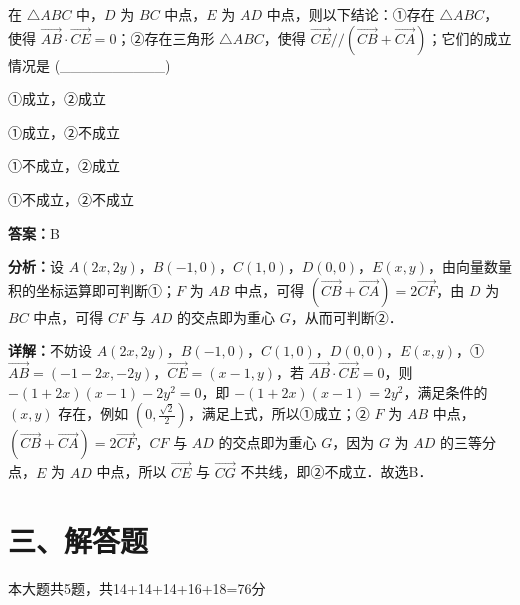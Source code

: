 \begin{question}[points=5]
在 $\triangle ABC$ 中，$D$ 为 $BC$ 中点，$E$ 为 $AD$ 中点，则以下结论：①存在 $\triangle ABC$，使得 $\overrightarrow{AB}\cdot\overrightarrow{CE}=0$；②存在三角形 $\triangle ABC$，使得 $\overrightarrow{CE}//(\overrightarrow{CB}+\overrightarrow{CA})$；它们的成立情况是 (\_\_\_\_\_\_\_\_\_\_)
\begin{choices}
  \item ①成立，②成立
  \item ①成立，②不成立
  \item ①不成立，②成立
  \item ①不成立，②不成立
\end{choices}
\begin{solution}
\textbf{答案：}B

\textbf{分析：}设 $A(2x,2y)$，$B(-1,0)$，$C(1,0)$，$D(0,0)$，$E(x,y)$，由向量数量积的坐标运算即可判断①；$F$ 为 $AB$ 中点，可得 $(\overrightarrow{CB}+\overrightarrow{CA})=2\overrightarrow{CF}$，由 $D$ 为 $BC$ 中点，可得 $CF$ 与 $AD$ 的交点即为重心 $G$，从而可判断②．

\textbf{详解：}不妨设 $A(2x,2y)$，$B(-1,0)$，$C(1,0)$，$D(0,0)$，$E(x,y)$，① $\overrightarrow{AB}=(-1-2x,-2y)$，$\overrightarrow{CE}=(x-1,y)$，若 $\overrightarrow{AB}\cdot\overrightarrow{CE}=0$，则 $-(1+2x)(x-1)-2y^2=0$，即 $-(1+2x)(x-1)=2y^2$，满足条件的 $(x,y)$ 存在，例如 $(0,\frac{\sqrt{2}}{2})$，满足上式，所以①成立；② $F$ 为 $AB$ 中点，$(\overrightarrow{CB}+\overrightarrow{CA})=2\overrightarrow{CF}$，$CF$ 与 $AD$ 的交点即为重心 $G$，因为 $G$ 为 $AD$ 的三等分点，$E$ 为 $AD$ 中点，所以 $\overrightarrow{CE}$ 与 $\overrightarrow{CG}$ 不共线，即②不成立．故选B．
\end{solution}
\end{question}

\section*{三、解答题}
本大题共5题，共14+14+14+16+18=76分

